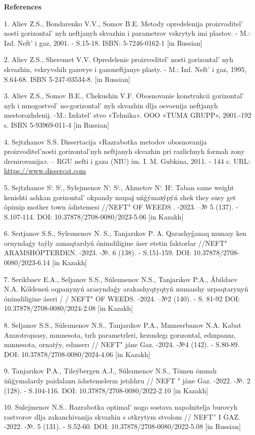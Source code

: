 \begin{center}
{\bfseries References}
\end{center}

\begin{references}

1. Aliev Z.S., Bondarenko V.V., Somov B.E. Metody opredelenija
proizvoditel' nosti gorizontal' nyh
neftjanyh skvazhin i parametrov vskrytyh imi plastov. - M.: Izd.
Neft'{} i gaz, 2001. - S.15-18. ISBN: 5-7246-0162-1 {[}in
Russian{]}

2. Aliev Z.S., Sheremet V.V. Opredelenie
proizvoditel' nosti gorizontal' nyh
skvazhin, vskryvshih gazovye i gazoneftjanye plasty. - M.: Izd.
Neft'{} i gaz, 1995, S.64-68. ISBN 5-247-03534-8. {[}in
Russian{]}

3. Aliev Z.S., Somov B.E., Chekushin V.F. Obosnovanie konstrukcii
gorizontal' nyh i
mnogostvol' no-gorizontal' nyh skvazhin
dlja osvoenija neftjanyh mestorozhdenij. -M.:
Izdatel' stvo «Tehnika». OOO «TUMA GRUPP», 2001.-192 s.
ISBN 5-93969-011-4 {[}in Russian{]}

4. Sejtzhanov S.S. Dissertacija «Razrabotka metodov obosnovanija
proizvoditel'nosti gorizontal'nyh neftjanyh skvazhin pri razlichnyh formah
zony drenirovanija». -- RGU nefti i gaza (NIU) im. I. M. Gubkina, 2011. -
144 c. URL: \url{https://www.dissercat.com}

5. Sejtzhanov S`. S`., Sylejmenov N`. S`., Ahmetov N`. H`. Taban same
weight kenishti ashkan gorizontal'{} okpandy mupaј
uńǵýmaѕýpýń shek they susy get ópimip mother town ádistemesi //NEFT" OF
WEEDS . -2023. --№ 5 (137). - S.107-114. DOI:
10.37878/2708-0080/2023-5.06 {[}in Kazakh{]}

6. Seıtjanov S.S., Syleımenov N. S., Tanjarıkov P. A. Qarashyǵanaq
munaıy ken ornyndaǵy taýly aımaqtardyń ónimdiligine áser etetin
faktorlar //NEFT" ARAMSHÓPTERDEN. -2023. -№. 6 (138). - S.151-159. DOI:
10.37878/2708-0080/2023-6.14 {[}in Kazakh{]}

7. Serikbaev E.A., Seljanov S.S., Súleımenov N.S., Tanjarıkov P.A.,
Ábildaev N.A. Kóldeneń oqpanynyń arasyndaǵy arakashyqtyqtyń munaıshy
urpaqtarynyń ónimdiligine áseri / / NEFT" OF WEEDS. -2024. --№2 (140). -
S. 81-92 DOI: 10.37878/2708-0080/2024-2.08 {[}in Kazakh{]}

8. Seljanov S.S., Súleımenov N.S., Tanjarıkov P.A., Mınnesrbanov N.A.
Kabat Anızotropıasy, mınnesota, tırlı parametrleri, kezındegı
gorızontal, edınpannı, mınnesota, ornatýy, edınserı // NEFT" jáne Gaz.
-2024. -№4 (142). - S.80-89. DOI: 10.37878/2708-0080/2024-4.06 {[}in
Kazakh{]}

9. Tanjarıkov P.A., Tileýbergen A.J., Súleımenov N.S., Tömen önımdı
ūñğymalardy paidalanu ädıstemelerın jetıldıru // NEFT " jáne Gaz. -2022.
-№. 2 (128). - S.104-116. DOI: 10.37878/2708-0080/2022-2.10 {[}in
Kazakh{]}

10. Sulejmenov N.S.. Razrabotka optimal' nogo sostava
napolnitelja burovyh rastvorov dlja zakanchivanija skvazhin s otkrytym
stvolom // NEFT''{} I GAZ. -2022. -№. 5
(131). - S.52-60. DOI: 10.37878/2708-0080/2022-5.08 {[}in Russian{]}
\end{references}

